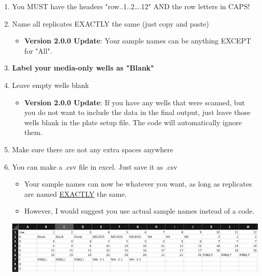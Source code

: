 \documentclass[12pt]{article}
\begin{document}
\begin{enumerate}
\begin{enumerate}
\item You MUST have the headers "row..1..2\ldots{}.12" AND the row letters in
CAPS!
\item Name all replicates EXACTLY the same (just copy and paste)
\begin{itemize}
\item \textbf{Version 2.0.0 Update}: Your sample names can be anything EXCEPT for "All".
\end{itemize}
\item \textbf{Label your media-only wells as "Blank"}
\item Leave empty wells blank
\begin{itemize}
\item \textbf{Version 2.0.0 Update}: If you have any wells that were scanned, but you do not want to include the data in the final output, just leave those wells blank in the plate setup file. The code will automatically ignore them.
\end{itemize}
\item Make sure there are not any extra spaces anywhere
\item You can make a .csv file in excel. Just save it as .csv
\begin{itemize}
\item Your sample names can now be whatever you want, as long as replicates are named \uline{EXACTLY} the same.
\item However, I would suggest you use actual sample names instead of a code.
\end{itemize}

\begin{center}
\includegraphics[width=.9\linewidth]{./process_plate_reader_data_image03.png}
\end{center}
\end{enumerate}
\end{enumerate}
\end{document}
